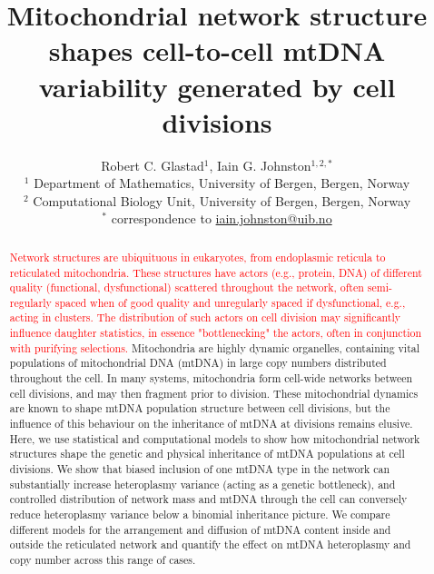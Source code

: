 \documentclass{article}
\title{Mitochondrial network structure shapes cell-to-cell mtDNA variability generated by cell divisions}
\author{Robert C. Glastad${}^1$, Iain G. Johnston${}^{1,2,*}$ \\ \footnotesize ${}^1$ Department of Mathematics, University of Bergen, Bergen, Norway \\ \footnotesize ${}^2$ Computational Biology Unit, University of Bergen, Bergen, Norway \\ \footnotesize ${}^*$ correspondence to \url{iain.johnston@uib.no}}
\date{}
\begin{document}
\maketitle
\begin{abstract}
\textcolor{red}{Network structures are ubiquituous in eukaryotes, from endoplasmic reticula to reticulated mitochondria. These structures have actors (e.g., protein, DNA) of different quality (functional, dysfunctional) scattered throughout the network, often semi-regularly spaced when of good quality and unregularly spaced if dysfunctional, e.g., acting in clusters. The distribution of such actors on cell division may significantly influence daughter statistics, in essence "bottlenecking" the actors, often in conjunction with purifying selections.} Mitochondria are highly dynamic organelles, containing vital populations of mitochondrial DNA (mtDNA) in large copy numbers distributed throughout the cell. In many systems, mitochondria form cell-wide networks between cell divisions, and may then fragment prior to division. These mitochondrial dynamics are known to shape mtDNA population structure between cell divisions, but the influence of this behaviour on the inheritance of mtDNA at divisions remains elusive. Here, we use statistical and computational models to show how mitochondrial network structures shape the genetic and physical inheritance of mtDNA populations at cell divisions. We show that biased inclusion of one mtDNA type in the network can substantially increase heteroplasmy variance (acting as a genetic bottleneck), and controlled distribution of network mass and mtDNA through the cell can conversely reduce heteroplasmy variance below a binomial inheritance picture. We compare different models for the arrangement and diffusion of mtDNA content inside and outside the reticulated network and quantify the effect on mtDNA heteroplasmy and copy number across this range of cases.
\end{abstract}
\end{document}
